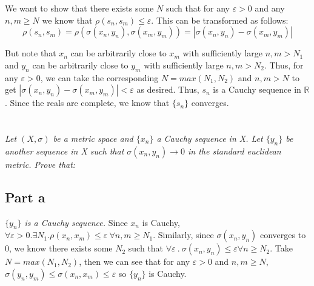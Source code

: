 \documentclass[]{article}
\newcommand{\reals}{\mathbb{R}}
\begin{document}
		We want to show that there exists some $N$ such that for any $\varepsilon > 0$ and any $n, m \geq N$ we know that $\rho(s_n, s_m) \leq \varepsilon$. This can be transformed as follows:
		\[\rho(s_n, s_m) = \rho(\sigma(x_n, y_n), \sigma(x_m, y_m)) = |\sigma(x_n, y_n) - \sigma(x_m, y_m)|\]

		But note that $x_n$ can be arbitrarily close to $x_m$ with sufficiently large $n, m > N_1$and $y_n$ can be arbitrarily close to $y_m$ with sufficiently large $n, m > N_2$. Thus, for any $\varepsilon > 0$, we can take the corresponding $N = max(N_1, N_2)$ and $n, m > N$ to get $|\sigma(x_n, y_n) - \sigma(x_m, y_m)| < \varepsilon$ as desired. Thus, $s_n$ is a Cauchy sequence in $\reals$. Since the reals are complete, we know that $\{s_n\}$ converges. 



	\section{}
		\textit{Let $(X, \sigma)$ be a metric space and $\{x_n\}$ a Cauchy sequence in X. Let $\{y_n\}$ be another sequence in X such that $\sigma(x_n, y_n) \to 0$ in the standard euclidean metric. Prove that:}

		\subsection*{Part a}
		\textit{$\{y_n\}$ is a Cauchy sequence.}
		Since $x_n$ is Cauchy, $\forall \varepsilon > 0 . \exists N_1 . \rho(x_n, x_m) \leq \varepsilon\ \forall n, m \geq N_1$. Similarly, since $\sigma(x_n, y_n)$ converges to 0, we know there exists some $N_2$ such that $\forall \varepsilon\ .\ \sigma(x_n, y_n) \leq \varepsilon \forall n \geq N_2$. Take $N = max(N_1, N_2)$, then we can see that for any $\varepsilon > 0$ and $n, m \geq N$, $\sigma(y_n, y_m) \leq \sigma(x_n, x_m) \leq \varepsilon$ so $\{y_n\}$ is Cauchy. 
\end{document}
